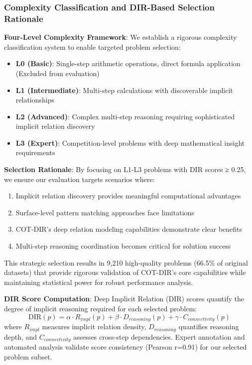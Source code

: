 \subsubsection{Complexity Classification and DIR-Based Selection Rationale}

\textbf{Four-Level Complexity Framework}: We establish a rigorous complexity classification system to enable targeted problem selection:

\begin{itemize}
    \item \textbf{L0 (Basic)}: Single-step arithmetic operations, direct formula application (Excluded from evaluation)
    \item \textbf{L1 (Intermediate)}: Multi-step calculations with discoverable implicit relationships
    \item \textbf{L2 (Advanced)}: Complex multi-step reasoning requiring sophisticated implicit relation discovery
    \item \textbf{L3 (Expert)}: Competition-level problems with deep mathematical insight requirements
\end{itemize}

\textbf{Selection Rationale}: By focusing on L1-L3 problems with DIR scores ≥ 0.25, we ensure our evaluation targets scenarios where:
\begin{enumerate}
    \item Implicit relation discovery provides meaningful computational advantages
    \item Surface-level pattern matching approaches face limitations
    \item COT-DIR's deep relation modeling capabilities demonstrate clear benefits
    \item Multi-step reasoning coordination becomes critical for solution success
\end{enumerate}

This strategic selection results in 9,210 high-quality problems (66.5\% of original datasets) that provide rigorous validation of COT-DIR's core capabilities while maintaining statistical power for robust performance analysis.

\textbf{DIR Score Computation}: Deep Implicit Relation (DIR) scores quantify the degree of implicit reasoning required for each selected problem:
\begin{equation}
\text{DIR}(p) = \alpha \cdot R_{impl}(p) + \beta \cdot D_{reasoning}(p) + \gamma \cdot C_{connectivity}(p)
\end{equation}
where $R_{impl}$ measures implicit relation density, $D_{reasoning}$ quantifies reasoning depth, and $C_{connectivity}$ assesses cross-step dependencies. Expert annotation and automated analysis validate score consistency (Pearson r=0.91) for our selected problem subset.

